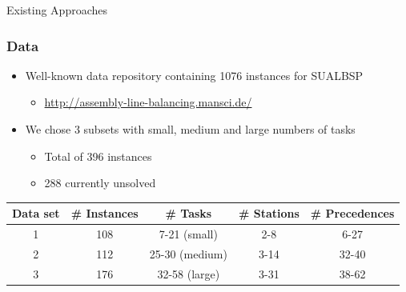 \documentclass{beamer}
\begin{document}
\begin{frame}
\begin{figure}
\end{figure}
\end{frame}

\begin{frame}
\Huge{\centerline{Existing Approaches}}
\end{frame}

\begin{frame}
\frametitle{Data}
\begin{itemize}
	\item Well-known data repository containing 1076 instances for SUALBSP\vspace{1mm}
	\begin{itemize}
		\item \url{http://assembly-line-balancing.mansci.de/}\vspace{3mm} \pause
	\end{itemize}
	\item We chose 3 subsets with small, medium and large numbers of tasks \vspace{3mm}
	\begin{itemize}
		\item Total of 396 instances\pause
		\item {\color{red} 288 currently unsolved}\pause
	\end{itemize}
\end{itemize}
\begin{table}
	\centering
	\begin{tabular}{ccccc}
		\toprule
		Data set & \# Instances  & \# Tasks & \# Stations & \# Precedences \\\midrule\midrule
		1 & 108 & 7-21 (small) & 2-8 & 6-27 \\
		2 & 112 & 25-30 (medium) & 3-14 & 32-40 \\
		3 & 176 & 32-58 (large) & 3-31 & 38-62 \\
		\bottomrule
	\end{tabular}
\end{table}
\end{frame}
\end{document}
